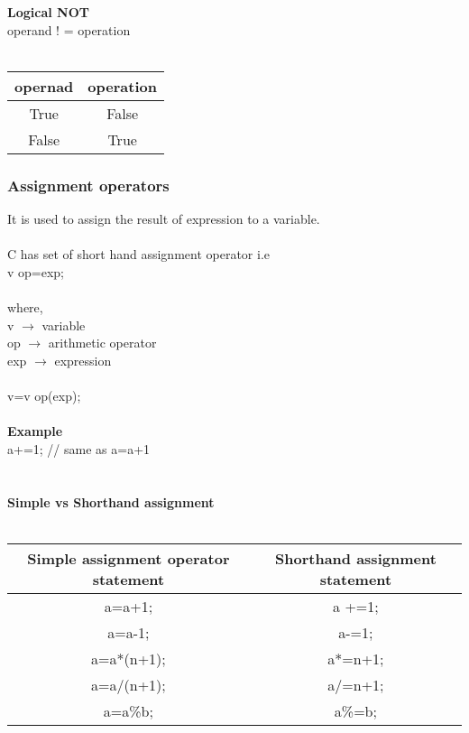 \documentclass{article}
\begin{document}
	\\ \\
	\textbf{Logical NOT} \\
	operand ! = operation
	\\ \\
	\begin{tabular}{|c|c|}
		\hline
		opernad & operation \\
		\hline
		True & False \\
		False & True \\
		\hline
	\end{tabular}

	\newpage

	\subsubsection{Assignment operators}
	It is used to assign the result of expression to a variable.
	\\ \\
	C has set of short hand assignment operator i.e \\
	\tab \tab v op=exp;
	\\ \\
	where, \\
	\tab \tab v $\longrightarrow$ variable \\
	\tab \tab op $\longrightarrow$ arithmetic operator \\
	\tab \tab exp $\longrightarrow$ expression
	\\ \\
	v=v op(exp);
	\\ \\
	\textbf{Example} \\
	a+=1; // same as a=a+1 \\
	\\ \\
	\textbf{Simple vs Shorthand assignment} \\ \\
	\begin{tabular}{|c|c|}
		\hline
		Simple assignment operator statement & Shorthand assignment statement \\
		\hline
		a=a+1; & a +=1; \\
		a=a-1; & a-=1; \\
		a=a*(n+1); & a*=n+1; \\
		a=a/(n+1); & a/=n+1; \\
		a=a\%b; & a\%=b; \\
		\hline		
	\end{tabular}
\end{document}
